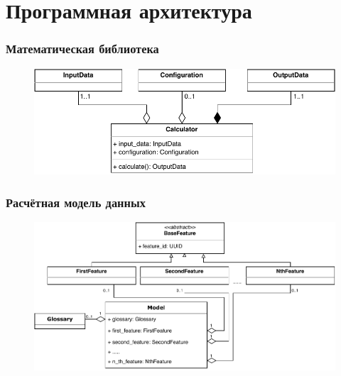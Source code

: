 \section{Программная архитектура}
\begin{frame}
\frametitle{Математическая библиотека}
\begin{figure}
    \includegraphics[scale=.8]{pictures/architecture/math_classes}
\end{figure}
\end{frame}

\begin{frame}
\frametitle{Расчётная модель данных}
\begin{figure}
    \includegraphics[scale=.7]{pictures/architecture/model_classes}
\end{figure}
\end{frame}
